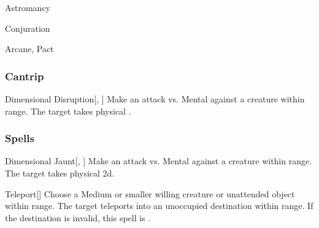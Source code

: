 \newpage
\begin{spellsection}{Astromancy}

\begin{spellheader}
\end{spellheader}


 Conjuration

 Arcane, Pact

\subsubsection{Cantrip}


\begin{freeability}{Dimensional Disruption}[, ]
Make an attack vs. Mental against a creature within \rngmed range.
\hit The target takes physical .
\end{freeability}

\end{spellsection}


\subsubsection{Spells}


\lowercase{\hypertarget{spell:Dimensional Jaunt}{}}\label{spell:Dimensional Jaunt}
\begin{apability}[\nth{1}]{\hypertarget{spell:Dimensional Jaunt}{Dimensional Jaunt}}[, ]
Make an attack vs. Mental against a creature within \rngmed range.
\hit The target takes physical  \plus2d.
\end{apability}
\vspace{0.25em}



\lowercase{\hypertarget{spell:Teleport}{}}\label{spell:Teleport}
\begin{apability}[\nth{1}]{\hypertarget{spell:Teleport}{Teleport}}[]
Choose a Medium or smaller willing creature or unattended object within \rngclose range.
The target teleports into an unoccupied destination within range.
If the destination is invalid, this spell is .
\end{apability}
\vspace{0.25em}



